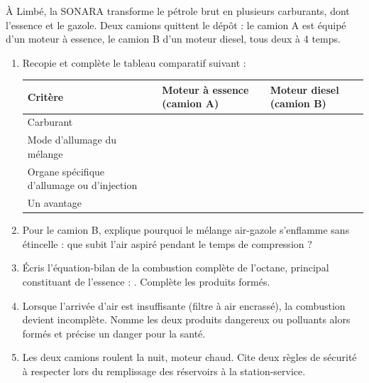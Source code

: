 \documentclass[11pt]{article}
\begin{document}
\begin{exercice}
À Limbé, la SONARA transforme le pétrole brut en plusieurs carburants, dont l'essence et le gazole. Deux camions quittent le dépôt : le camion A est équipé d'un moteur à essence, le camion B d'un moteur diesel, tous deux à 4 temps.
\begin{enumerate}
\item Recopie et complète le tableau comparatif suivant :

\begin{center}
\begin{tabularx}{\linewidth}{|l|X|X|}
\hline
\rowcolor{popblueL} Critère & Moteur à essence (camion A) & Moteur diesel (camion B) \\
\hline
Carburant & & \\
\hline
Mode d'allumage du mélange & & \\
\hline
Organe spécifique d'allumage ou d'injection & & \\
\hline
Un avantage & & \\
\hline
\end{tabularx}
\end{center}

\item Pour le camion B, explique pourquoi le mélange air-gazole s'enflamme sans étincelle : que subit l'air aspiré pendant le temps de compression ?
\item Écris l'équation-bilan de la combustion complète de l'octane, principal constituant de l'essence : . Complète les produits formés.
\item Lorsque l'arrivée d'air est insuffisante (filtre à air encrassé), la combustion devient incomplète. Nomme les deux produits dangereux ou polluants alors formés et précise un danger pour la santé.
\item Les deux camions roulent la nuit, moteur chaud. Cite deux règles de sécurité à respecter lors du remplissage des réservoirs à la station-service.
\end{enumerate}
\end{exercice}
\end{document}
